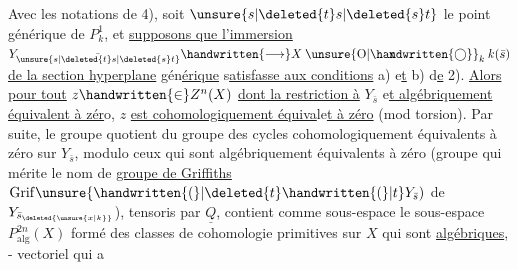  Avec les notations de 4),  soit $\unsure{s|\deleted{t}s|\deleted{s}t}$ le point générique de $P^1_k$, et \uline{supposons que l'immersion} $Y_{\bar{\unsure{s|\deleted{t}s|\deleted{s}t}}}\handwritten{\longrightarrow}X\mathbin{\ooalign{\hfil$\mathrm{x}$\hfil\cr\hfil$\unsure{\mathrm{O}|\handwritten{\bigcirc}}$\hfil\cr}}_k k(\bar s)$ \uline{de la section hyperplane} gén\uline{érique}  s\uline{atisfasse aux conditions} a) e\uline{t} b) d\uline{e} 2). \uline{Alors pour tout} $z\handwritten{\in}Z^n(X)$ \uline{dont la restriction à} $Y_{\bar s}$ e\uline{t algébriquement équivalent à zér}o, $z$ \uline{est cohomologiquement équiva}le\uline{t à zéro} (mod torsion).  Par suite, le groupe quotient du groupe des cycles cohomologiquement équivalents à zéro  sur $Y_{\bar s}$, modulo ceux qui sont algébriquement équivalents à zéro (groupe qui mérite le nom de \uline{groupe de Griffiths} $\mathrm{Grif}\unsure{\handwritten{(}|\deleted{t}\handwritten{(}|t}Y_{\bar s})$ de $Y_{\bar s_{\deleted{\unsure{x|k}}}}$), tensoris par $\underline{Q}$, contient comme sous-espace le sous-espace $P^{2n}_{\mathrm{alg}}(X)$ formé des classes de cohomologie primitives sur $X$ qui sont \uline{algébriques}, - vectoriel qui a
